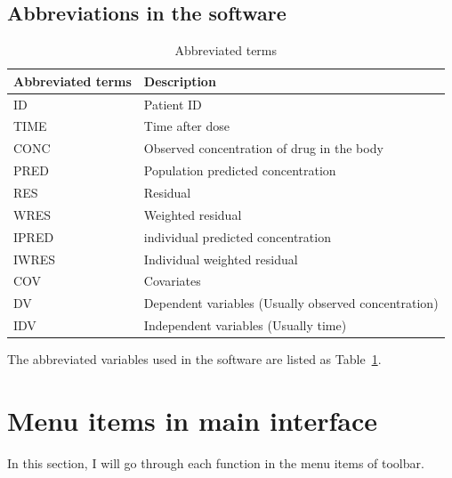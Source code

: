 \documentclass[a4paper]{article}
\begin{document}
\subsection{Abbreviations in the software}
\begin{table}[h!tb] \centering
\begin{tabular}{l l} \hline
\textbf{ Abbreviated terms} & \textbf{Description}  \\ \hline
ID & Patient ID \\
TIME & Time after dose \\
CONC & Observed concentration of drug in the body \\
PRED & Population predicted concentration \\
RES & Residual \\
WRES & Weighted residual \\
IPRED & individual predicted concentration \\
IWRES & Individual weighted residual \\
COV & Covariates \\ 
DV & Dependent variables (Usually observed concentration) \\
IDV & Independent variables (Usually time) \\
\hline
\end{tabular}
\caption{Abbreviated terms}
\label{tnew_function_1}
\end{table}
The abbreviated variables used in the software are listed as Table~\ref{tnew_function_1}.

\section{Menu items in main interface}
In this section, I will go through each function in the menu items of toolbar.
\end{document}
